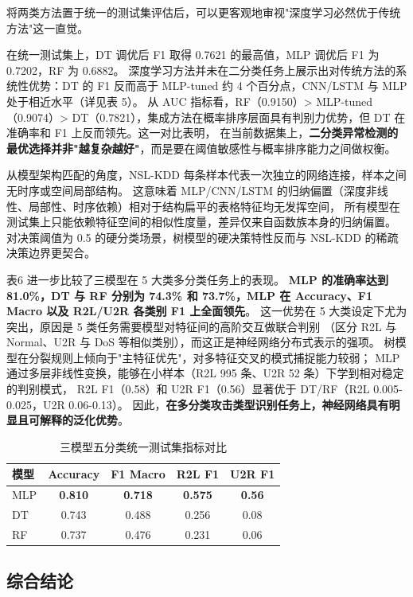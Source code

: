 将两类方法置于统一的测试集评估后，可以更客观地审视"深度学习必然优于传统方法"这一直觉。

在统一测试集上，DT 调优后 F1 取得 0.7621 的最高值，MLP 调优后 F1 为 0.7202，RF 为 0.6882。
深度学习方法并未在二分类任务上展示出对传统方法的系统性优势：DT 的 F1 反而高于 MLP-tuned 约 4 个百分点，CNN/LSTM 与 MLP 处于相近水平（详见表 5）。
从 AUC 指标看，RF（0.9150）> MLP-tuned（0.9074）> DT（0.7821），集成方法在概率排序层面具有判别力优势，但 DT 在准确率和 F1 上反而领先。这一对比表明，
在当前数据集上，\textbf{二分类异常检测的最优选择并非"越复杂越好"}，而是要在阈值敏感性与概率排序能力之间做权衡。

从模型架构匹配的角度，NSL-KDD 每条样本代表一次独立的网络连接，样本之间无时序或空间局部结构。
这意味着 MLP/CNN/LSTM 的归纳偏置（深度非线性、局部性、时序依赖）相对于结构扁平的表格特征均无发挥空间，
所有模型在测试集上只能依赖特征空间的相似性度量，差异仅来自函数族本身的归纳偏置。
对决策阈值为 0.5 的硬分类场景，树模型的硬决策特性反而与 NSL-KDD 的稀疏决策边界更契合。

表6 进一步比较了三模型在 5 大类多分类任务上的表现。
\textbf{MLP 的准确率达到 81.0\%，DT 与 RF 分别为 74.3\% 和 73.7\%，MLP 在 Accuracy、F1 Macro 以及 R2L/U2R 各类别 F1 上全面领先}。
这一优势在 5 大类设定下尤为突出，原因是 5 类任务需要模型对特征间的高阶交互做联合判别
（区分 R2L 与 Normal、U2R 与 DoS 等相似类别），而这正是神经网络分布式表示的强项。
树模型在分裂规则上倾向于"主特征优先"，对多特征交叉的模式捕捉能力较弱；
MLP 通过多层非线性变换，能够在小样本（R2L 995 条、U2R 52 条）下学到相对稳定的判别模式，
R2L F1（0.58）和 U2R F1（0.56）显著优于 DT/RF（R2L 0.005-0.025，U2R 0.06-0.13）。
因此，\textbf{在多分类攻击类型识别任务上，神经网络具有明显且可解释的泛化优势}。

\begin{table}[htbp]
  \centering
\caption{三模型五分类统一测试集指标对比}
  \label{tab:multiclass-comparison}
  \small
  \begin{tabular}{lcccc}
    \toprule
    模型 & Accuracy & F1 Macro & R2L F1 & U2R F1 \\
    \midrule
    MLP & \textbf{0.810} & \textbf{0.718} & \textbf{0.575} & \textbf{0.56} \\
    DT  & 0.743 & 0.488 & 0.256 & 0.08 \\
    RF  & 0.737 & 0.476 & 0.231 & 0.06 \\
    \bottomrule
  \end{tabular}
\end{table}

\subsection{综合结论}

